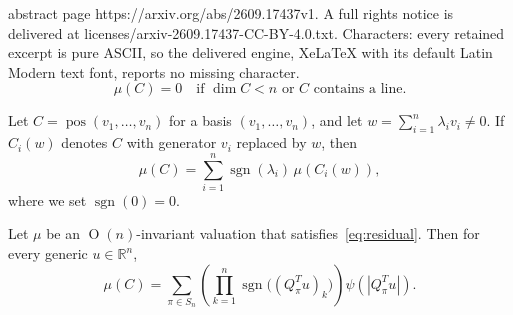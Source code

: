 \documentclass[10pt,a4paper]{amsart}
\DeclareMathOperator{\pos}{pos}
\DeclareMathOperator{\sgn}{sgn}
\newcommand{\On}[1]{\operatorname{O}(#1)}
\newcommand{\R}{\mathbb{R}}
\newcommand{\ip}[2]{\langle #1,#2\rangle}
\begin{document}
abstract page https://arxiv.org/abs/2609.17437v1. A full rights notice is delivered at licenses/arxiv-2609.17437-CC-BY-4.0.txt. Characters: every retained excerpt is pure ASCII, so the delivered engine, XeLaTeX with its default Latin Modern text font, reports no missing character.
\begin{equation}\tag{A}\label{eq:residual}
 \mu(C)=0\quad\text{if }\dim C<n\text{ or }C\text{ contains a line}.
\end{equation}

\begin{lemma}\label{lem:star}
  Let $C=\pos(v_1,\ldots,v_n)$ for a basis $(v_1,\ldots,v_n)$, and let
  $w=\sum_{i=1}^n\lambda_i v_i\ne0$. 
  If $C_i(w)$ denotes $C$ with generator $v_i$ replaced by $w$, then
  \begin{equation}\label{eq:star}
   \mu(C)=\sum_{i=1}^n\sgn(\lambda_i)\,\mu(C_i(w)),
  \end{equation}
  where we set $\sgn(0)=0$.
\end{lemma}

\begin{theorem}\label{thm:flag}
Let $\mu$ be an $\On n$-invariant valuation that satisfies~\eqref{eq:residual}. Then for every generic $u\in\R^n$,
\begin{equation}\label{eq:flag}
 \mu(C)=\sum_{\pi\in S_n}
  \left(\prod_{k=1}^n\sgn\bigl((Q_\pi^Tu)_k\bigr)\right)
  \psi(|Q_\pi^Tu|).
\end{equation}
\end{theorem}
\end{document}
